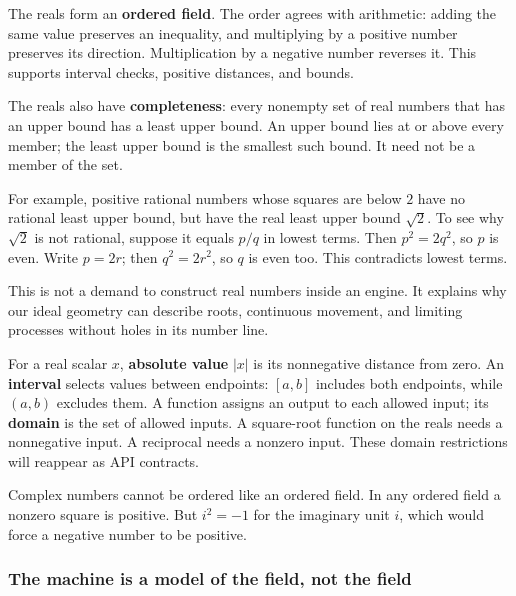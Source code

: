\hypertarget{01-foundations-i-ch017-why-graphics-uses-real-number-models}{}

The reals form an \textbf{ordered field}. The order agrees with arithmetic: adding the same value preserves an inequality, and multiplying by a positive number preserves its direction. Multiplication by a negative number reverses it. This supports interval checks, positive distances, and bounds.

The reals also have \textbf{completeness}: every nonempty set of real numbers that has an upper bound has a least upper bound. An upper bound lies at or above every member; the least upper bound is the smallest such bound. It need not be a member of the set.

For example, positive rational numbers whose squares are below \(2\) have no rational least upper bound, but have the real least upper bound \(\sqrt2\). To see why \(\sqrt2\) is not rational, suppose it equals \(p/q\) in lowest terms. Then \(p^2=2q^2\), so \(p\) is even. Write \(p=2r\); then \(q^2=2r^2\), so \(q\) is even too. This contradicts lowest terms.

This is not a demand to construct real numbers inside an engine. It explains why our ideal geometry can describe roots, continuous movement, and limiting processes without holes in its number line.

For a real scalar \(x\), \textbf{absolute value} \(|x|\) is its nonnegative distance from zero. An \textbf{interval} selects values between endpoints: \([a,b]\) includes both endpoints, while \((a,b)\) excludes them. A function assigns an output to each allowed input; its \textbf{domain} is the set of allowed inputs. A square-root function on the reals needs a nonnegative input. A reciprocal needs a nonzero input. These domain restrictions will reappear as API contracts.

Complex numbers cannot be ordered like an ordered field. In any ordered field a nonzero square is positive. But \(i^2=-1\) for the imaginary unit \(i\), which would force a negative number to be positive.

\subsubsection{The machine is a model of the field, not the field}\label{01-foundations-i-ch017-the-machine-is-a-model-of-the-field-not-the-field}

\hypertarget{01-foundations-i-ch017-the-machine-is-a-model-of-the-field-not-the-field}{}

